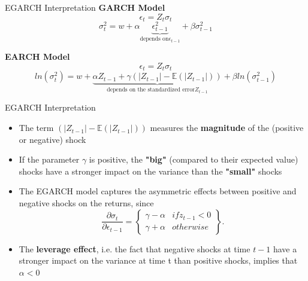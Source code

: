 \documentclass{beamer}
\def\R{\mathbb{R}}
\def\Esp{\mathbb{E}}
\newcommand{\imfbold}[1]{\textbf{\textcolor{imfblue}{#1}}}
\begin{document}
\begin{frame}{EGARCH Interpretation}
    \textbf{GARCH Model}
        $$\epsilon_t = Z_t\sigma_t$$
        $$\sigma_t^2 = w + \alpha \underbrace{\epsilon_{t-1}^2}_{\text{depends on}\epsilon_{t-1}} +\beta \sigma_{t-1}^2$$

        
    \textbf{EARCH Model}
        $$\epsilon_t = Z_t\sigma_t$$
        $$ln(\sigma_t^2) =w + \underbrace{\alpha Z_{t-1} + \gamma\left(|Z_{t-1}| - \Esp(|Z_{t-1}|)\right)}_{\text{depends on the standardized error} Z_{t-1}} +\beta ln(\sigma_{t-1}^2)$$
\end{frame}
\begin{frame}{EGARCH Interpretation}
    \begin{itemize}
    \item The term $\left(|Z_{t-1}| - \Esp(|Z_{t-1}|)\right)$ measures the \imfbold{magnitude} of the (positive or negative) shock
    \item If the parameter $\gamma$ is positive, the \imfbold{"big"} (compared to their expected value) shocks have a stronger impact on the variance than the \imfbold{"small"} shocks
        \item The EGARCH model captures the asymmetric effects between positive and negative shocks on the returns, since
        $$\frac{\partial\sigma_t}{\partial\epsilon_{t-1}} = \left\{
        \begin{matrix}
                         \gamma - \alpha & if z_{t-1} <0\\ 
                         \gamma + \alpha & otherwise
        \end{matrix}
        \right\}.$$
        \item The \imfbold{leverage effect}, i.e. the fact that negative shocks at time $t -1$ have a stronger impact on the variance at time t than positive shocks, implies that $\alpha <0$
    \end{itemize} 
\end{frame}
        
        
\end{document}
